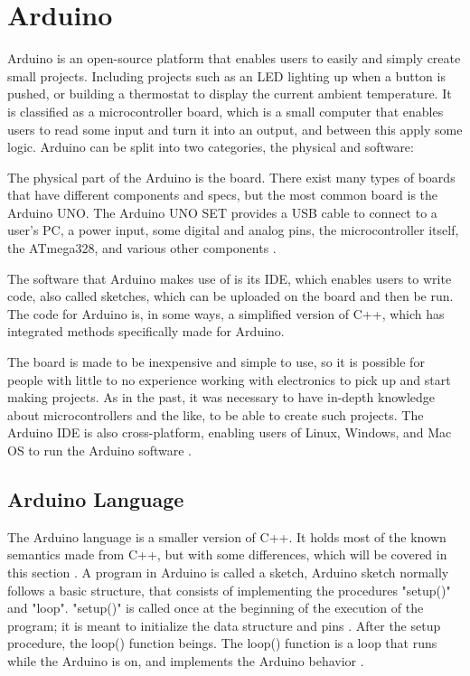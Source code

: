 \section{Arduino}\label{sec:arduino}
Arduino is an open-source platform that enables users to easily and simply create small projects. Including projects such as an LED lighting up when a button is pushed, or building a thermostat to display the current ambient temperature. It is classified as a microcontroller board, which is a small computer that enables users to read some input and turn it into an output, and between this apply some logic. Arduino can be split into two categories, the physical and software:

The physical part of the Arduino is the board. There exist many types of boards that have different components and specs, but the most common board is the Arduino UNO. The Arduino UNO SET provides a USB cable to connect to a user's PC, a power input, some digital and analog pins, the microcontroller itself, the ATmega328, and various other components \cite{WhatArduinoLearn}.

The software that Arduino makes use of is its IDE, which enables users to write code, also called sketches, which can be uploaded on the board and then be run. The code for Arduino is, in some ways, a simplified version of C++, which has integrated methods specifically made for Arduino.

The board is made to be inexpensive and simple to use, so it is possible for people with little to no experience working with electronics to pick up and start making projects. As in the past, it was necessary to have in-depth knowledge about microcontrollers and the like, to be able to create such projects. The Arduino IDE is also cross-platform, enabling users of Linux, Windows, and Mac OS to run the Arduino software \cite{WhatArduino}.

\subsection{Arduino Language}\label{sec:arduinolanguage}
The Arduino language is a smaller version of C++. It holds most of the known semantics made from C++, but with some differences, which will be covered in this section \cite{WhatArduino}. A program in Arduino is called a sketch, Arduino sketch normally follows a basic structure, that consists of implementing the procedures "setup()" and "loop". "setup()" is called once at the beginning of the execution of the program; it is meant to initialize the data structure and pins \cite{ArduinoSetup}. After the setup procedure, the loop() function beings. The loop() function is a loop that runs while the Arduino is on, and implements the Arduino behavior \cite{ArduinoLoop}.


